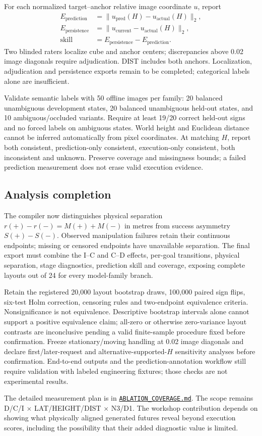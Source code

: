 For each normalized target--anchor relative image coordinate $u$, report
\begin{align}
E_{\mathrm{prediction}} &= \lVert u_{\mathrm{pred}}(H)-u_{\mathrm{actual}}(H)\rVert_2,\\
E_{\mathrm{persistence}} &= \lVert u_{\mathrm{current}}-u_{\mathrm{actual}}(H)\rVert_2,\\
\mathrm{skill} &= E_{\mathrm{persistence}}-E_{\mathrm{prediction}}.
\end{align}
Two blinded raters localize cube and anchor centers; discrepancies above 0.02 image diagonals require adjudication. DIST includes both anchors. Localization, adjudication and persistence exports remain to be completed; categorical labels alone are insufficient.

Validate semantic labels with 50 offline images per family: 20 balanced unambiguous development states, 20 balanced unambiguous held-out states, and 10 ambiguous/occluded variants. Require at least 19/20 correct held-out signs and no forced labels on ambiguous states. World height and Euclidean distance cannot be inferred automatically from pixel coordinates. At matching $H$, report both consistent, prediction-only consistent, execution-only consistent, both inconsistent and unknown. Preserve coverage and missingness bounds; a failed prediction measurement does not erase valid execution evidence.

\subsection{Analysis completion}
The compiler now distinguishes physical separation $r(+)-r(-)=M(+)+M(-)$ in metres from success asymmetry $S(+)-S(-)$. Observed manipulation failures retain their continuous endpoints; missing or censored endpoints have unavailable separation. The final export must combine the I--C and C--D effects, per-goal transitions, physical separation, stage diagnostics, prediction skill and coverage, exposing complete layouts out of 24 for every model-family branch.

Retain the registered 20,000 layout bootstrap draws, 100,000 paired sign flips, six-test Holm correction, censoring rules and two-endpoint equivalence criteria. Nonsignificance is not equivalence. Descriptive bootstrap intervals alone cannot support a positive equivalence claim; all-zero or otherwise zero-variance layout contrasts are inconclusive pending a valid finite-sample procedure fixed before confirmation. Freeze stationary/moving handling at 0.02 image diagonals and declare first/later-request and alternative-supported-$H$ sensitivity analyses before confirmation. End-to-end outputs and the prediction-annotation workflow still require validation with labeled engineering fixtures; those checks are not experimental results.

The detailed measurement plan is in
\href{https://github.com/adeeb10abbas/world-action-model-steerability/blob/main/docs/scene_design_rtx/ABLATION_COVERAGE.md}{\texttt{ABLATION\_COVERAGE.md}}.
The scope remains D/C/I $\times$ LAT/HEIGHT/DIST $\times$ N3/D1. The workshop contribution depends on showing what physically aligned generated futures reveal beyond execution scores, including the possibility that their added diagnostic value is limited.
